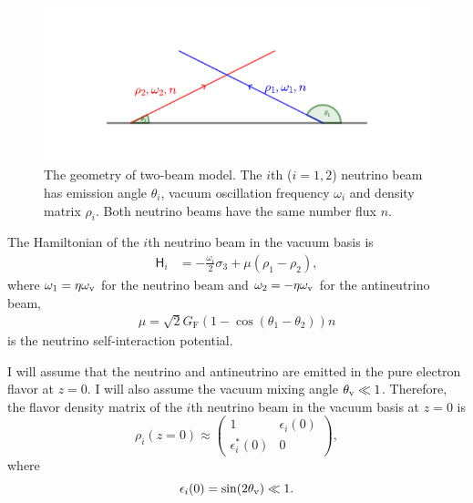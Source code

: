 \begin{figure}[!htbp]
    \centering
    \includegraphics[width=\textwidth]{chapters/assets/collective/two-beams-model-sym}
    \caption{The geometry of two-beam model. The $i$th ($i=1,2$) neutrino beam has emission angle $\theta_i$, vacuum oscillation frequency $\omega_i$ and density matrix $\rho_i$. Both neutrino beams have the same number flux $n$.}
    \label{chap:collective-sec:two-beams-fig:two-beam-line-model}
\end{figure}


The Hamiltonian of the $i$th neutrino beam in the vacuum basis is
\begin{align}
   \mathsf H_i &= -\frac{\omega_i}{2}  \sigma_3 + \mu ( \rho_1 -  \rho_2),
\end{align}
where $\omega_1 = \eta\omega_\mathrm v$ for the neutrino beam and $\omega_2=-\eta\omega_\mathrm v$ for the antineutrino beam,
\begin{align}
   \mu = \sqrt{2} G_{\mathrm F}  (1 - \cos(\theta_1 - \theta_2))  n
\end{align}
is the neutrino self-interaction potential.

I will assume that the neutrino and antineutrino are emitted in the pure electron flavor at $z=0$. I will also assume the vacuum mixing angle $\theta_\mathrm v \ll 1$. Therefore, the flavor density matrix of the $i$th neutrino beam in the vacuum basis at $z=0$ is
\begin{equation}
    \rho_i (z=0)  \approx  \begin{pmatrix}
        1 & \epsilon_i (0) \\
        \epsilon_i^* (0) & 0
    \end{pmatrix},
    \label{chap:collective-sec:two-beams-eqn:density-matrix-perturbed}
\end{equation}
where
\begin{equation}
    \epsilon_i(0) = \sin (2\theta_\mathrm v) \ll 1.
\end{equation}

